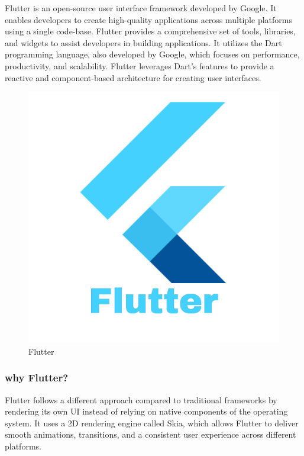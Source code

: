 \documentclass[
12pt,
oneside, 
onehalfspacing, 
nolistspacing, 
parskip, 
chapterinoneline, 
]{AASTCOMPUTER}
\begin{document}
Flutter is an open-source user interface framework developed by Google. It enables developers to create high-quality applications across multiple platforms using a single code-base. Flutter provides a comprehensive set of tools, libraries, and widgets to assist developers in building applications. It utilizes the Dart programming language, also developed by Google, which focuses on performance, productivity, and scalability. Flutter leverages Dart's features to provide a reactive and component-based architecture for creating user interfaces.


\begin{figure}[!ht]
	\centering
	\includegraphics[scale=0.5]{Figures/FrontEnd/MobileApplication/flutter.png}
  	\caption{Flutter}
  	\label{fig:Flutter}
\end{figure}
\subsubsection{why Flutter?}

Flutter follows a different approach compared to traditional frameworks by rendering its own UI instead of relying on native components of the operating system. It uses a 2D rendering engine called Skia, which allows Flutter to deliver smooth animations, transitions, and a consistent user experience across different platforms.
\end{document}

